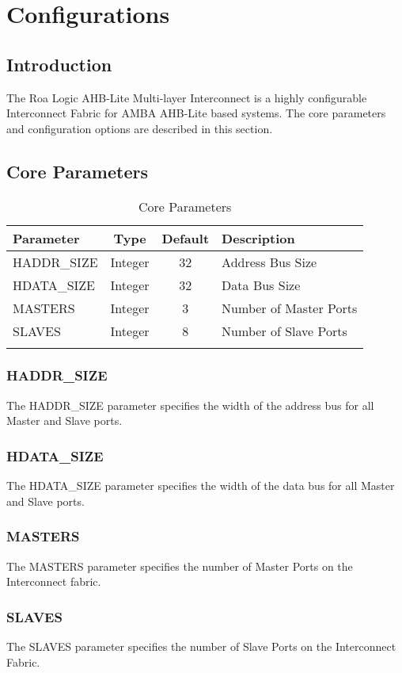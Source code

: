 \chapter{Configurations}\label{configurations}


\section{Introduction}\label{introduction-1}


The Roa Logic AHB-Lite Multi-layer Interconnect is a highly configurable
Interconnect Fabric for AMBA AHB-Lite based systems. The core parameters
and configuration options are described in this section.

\section{Core Parameters}\label{core-parameters}

\begin{longtable}[]{@{}lccl@{}}
\toprule
Parameter & Type & Default & Description\tabularnewline
\midrule
\endhead
HADDR\_SIZE & Integer & 32 & Address Bus Size\tabularnewline
HDATA\_SIZE & Integer & 32 & Data Bus Size\tabularnewline
MASTERS & Integer & 3 & Number of Master Ports\tabularnewline
SLAVES & Integer & 8 & Number of Slave Ports\tabularnewline
\bottomrule
\caption{Core Parameters}
\end{longtable}

\subsection{HADDR\_SIZE}\label{haddr_size}

The HADDR\_SIZE parameter specifies the width of the address bus for all
Master and Slave ports.

\subsection{HDATA\_SIZE}\label{hdata_size}

The HDATA\_SIZE parameter specifies the width of the data bus for all
Master and Slave ports.

\subsection{MASTERS}\label{masters}

The MASTERS parameter specifies the number of Master Ports on the
Interconnect fabric.

\subsection{SLAVES}\label{slaves}

The SLAVES parameter specifies the number of Slave Ports on the
Interconnect Fabric.
